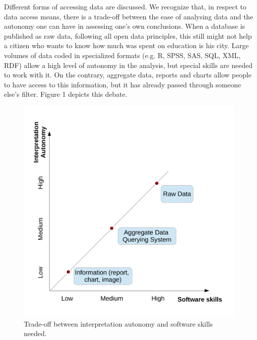 Different forms of accessing data are discussed. We recognize that, in respect to data access means, there is a trade-off between the ease of analysing data and the autonomy one can have in assessing one’s own conclusions. When a database is published as raw data, following all open data principles, this still might not help a citizen who wants to know how much was spent on education is his city. Large volumes of data coded in specialized formats (e.g. R, SPSS, SAS, SQL, XML, RDF) allow a high level of autonomy in the analysis, but special skills are needed to work with it. On the contrary, aggregate data, reports and charts allow people to have access to this information, but it has already passed through someone else's filter. Figure 1 depicts this debate. 

\begin{figure}[h!]
\begin{center}
\includegraphics[scale=0.6]{images/opendatatradeoff.pdf}
\caption{Trade-off between interpretation autonomy and software skills needed.}
\label{fig:opendatatradeoff}
\end{center}
\end{figure}

